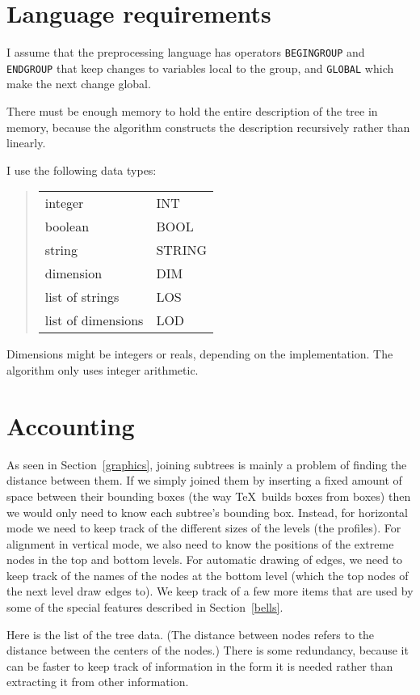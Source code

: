 \documentclass[11pt,english,BCOR10mm,DIV12,bibliography=totoc,parskip=false,smallheadings
    headexclude,footexclude,oneside]{pst-doc}
\begin{document}
\section{Language requirements}

I assume that the preprocessing language has operators \verb=BEGINGROUP= and \verb=ENDGROUP= that keep 
changes to variables local to the group, and \verb=GLOBAL= which make the next change global.

There must be enough memory to hold the entire description of the tree in memory, because 
the algorithm constructs the description recursively rather than linearly.

I use the following data types:
\begin{quote}
\begin{tabular}{ll}
 integer & INT\\
 boolean & BOOL\\
 string &  STRING\\
 dimension & DIM\\
 list of strings & LOS\\
 list of dimensions & LOD
\end{tabular}
\end{quote}
Dimensions might be integers or reals, depending on the implementation. The algorithm only uses integer arithmetic.

\section{Accounting}

As seen in Section~\ref{graphics}, joining subtrees is mainly a problem of finding the 
distance between them. If we simply joined them by inserting a fixed amount of space 
between their bounding boxes (the way \TeX\ builds boxes from boxes) then we would 
only need to know each subtree's bounding box. Instead, for horizontal mode we need 
to keep track of the different sizes of the levels (the profiles). For alignment in 
vertical mode, we also need to know the positions of the extreme nodes in the top and 
bottom levels. For automatic drawing of edges, we need to keep track of the names of 
the nodes at the bottom level (which the top nodes of the next level draw edges to). 
We keep track of a few more items that are used by some of the special features 
described in Section~\ref{bells}.

Here is the list of the tree data. (The distance between nodes refers to the distance between the 
centers of the nodes.) There is some redundancy, because it can be faster to keep track of 
information in the form it is needed rather than extracting it from other information.
\end{document}
